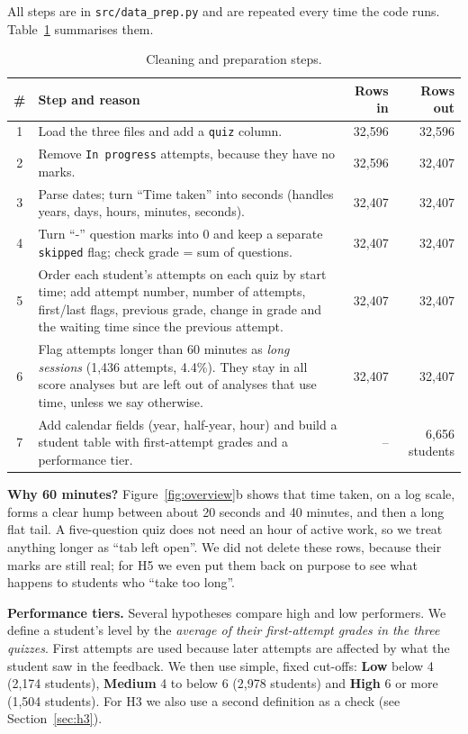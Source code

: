 \documentclass[11pt,a4paper]{article}
\begin{document}
All steps are in \texttt{src/data\_prep.py} and are repeated every time the
code runs. Table~\ref{tab:clean} summarises them.

\begin{table}[H]
\centering
\small
\caption{Cleaning and preparation steps.}
\label{tab:clean}
\begin{tabularx}{\linewidth}{@{}c X r r@{}}
\toprule
\# & \textbf{Step and reason} & \textbf{Rows in} & \textbf{Rows out} \\
\midrule
1 & Load the three files and add a \texttt{quiz} column. & 32,596 & 32,596 \\
2 & Remove \texttt{In progress} attempts, because they have no marks. & 32,596 & 32,407 \\
3 & Parse dates; turn ``Time taken'' into seconds (handles years, days, hours, minutes, seconds). & 32,407 & 32,407 \\
4 & Turn ``-'' question marks into 0 and keep a separate \texttt{skipped} flag; check grade = sum of questions. & 32,407 & 32,407 \\
5 & Order each student's attempts on each quiz by start time; add attempt number, number of attempts, first/last flags, previous grade, change in grade and the waiting time since the previous attempt. & 32,407 & 32,407 \\
6 & Flag attempts longer than 60 minutes as \emph{long sessions} (1,436 attempts, 4.4\%). They stay in all score analyses but are left out of analyses that use time, unless we say otherwise. & 32,407 & 32,407 \\
7 & Add calendar fields (year, half-year, hour) and build a student table with first-attempt grades and a performance tier. & -- & 6,656 students \\
\bottomrule
\end{tabularx}
\end{table}

\textbf{Why 60 minutes?} Figure~\ref{fig:overview}b shows that time taken, on a
log scale, forms a clear hump between about 20 seconds and 40 minutes, and
then a long flat tail. A five-question quiz does not need an hour of active
work, so we treat anything longer as ``tab left open''. We did not delete these
rows, because their marks are still real; for H5 we even put them back on
purpose to see what happens to students who ``take too long''.

\textbf{Performance tiers.} Several hypotheses compare high and low performers.
We define a student's level by the \emph{average of their first-attempt grades
in the three quizzes}. First attempts are used because later attempts are
affected by what the student saw in the feedback. We then use simple, fixed
cut-offs: \textbf{Low} below 4 (2,174 students), \textbf{Medium} 4 to below 6
(2,978 students) and \textbf{High} 6 or more (1,504 students). For H3 we also
use a second definition as a check (see Section~\ref{sec:h3}).
\end{document}
